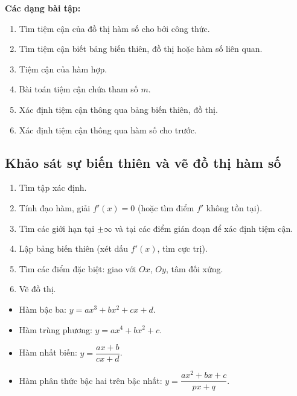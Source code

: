 \documentclass[12pt,a4paper]{article}
\begin{document}
\medskip\noindent\textbf{Các dạng bài tập:}
\begin{enumerate}[label=\textbf{Dạng \arabic*:}, leftmargin=*, align=left]
  \item Tìm tiệm cận của đồ thị hàm số cho bởi công thức.
  \item Tìm tiệm cận biết bảng biến thiên, đồ thị hoặc hàm số liên quan.
  \item Tiệm cận của hàm hợp.
  \item Bài toán tiệm cận chứa tham số $m$.
  \item Xác định tiệm cận thông qua bảng biến thiên, đồ thị.
  \item Xác định tiệm cận thông qua hàm số cho trước.
\end{enumerate}

\subsection{Khảo sát sự biến thiên và vẽ đồ thị hàm số}

\begin{phuongphap}[title={Sơ đồ khảo sát hàm số}]
  \begin{enumerate}
    \item Tìm tập xác định.
    \item Tính đạo hàm, giải $f'(x) = 0$ (hoặc tìm điểm $f'$ không tồn tại).
    \item Tìm các giới hạn tại $\pm\infty$ và tại các điểm gián đoạn để xác định tiệm cận.
    \item Lập bảng biến thiên (xét dấu $f'(x)$, tìm cực trị).
    \item Tìm các điểm đặc biệt: giao với $Ox$, $Oy$, tâm đối xứng.
    \item Vẽ đồ thị.
  \end{enumerate}
\end{phuongphap}

\begin{tinhchat}[title={Các dạng hàm số thường khảo sát}]
  \begin{itemize}
    \item Hàm bậc ba: $y = ax^3 + bx^2 + cx + d$.
    \item Hàm trùng phương: $y = ax^4 + bx^2 + c$.
    \item Hàm nhất biến: $y = \dfrac{ax + b}{cx + d}$.
    \item Hàm phân thức bậc hai trên bậc nhất: $y = \dfrac{ax^2 + bx + c}{px + q}$.
  \end{itemize}
\end{tinhchat}
\end{document}
